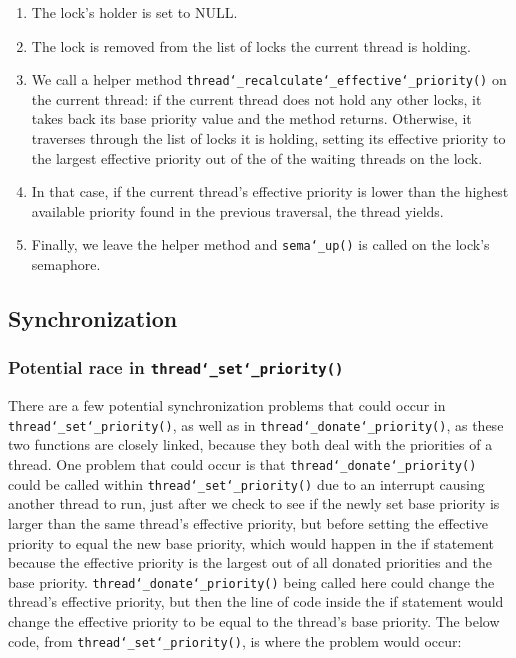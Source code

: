 \documentclass{article}
\renewcommand{\_}{\char`_}
\begin{document}
\begin{enumerate}

\item The lock's holder is set to NULL.

\item The lock is removed from the list of locks the current thread is holding.

\item We call a helper method \texttt{thread\_recalculate\_effective\_priority()} on the current thread: if the current thread does not hold any other locks, it takes back its base priority value and the method returns. Otherwise, it traverses through the list of locks it is holding, setting its effective priority to the largest effective priority out of the of the waiting threads on the lock.

\item In that case, if the current thread's effective priority is lower than the highest available priority found in the previous traversal, the thread yields.

\item Finally, we leave the helper method and \texttt{sema\_up()} is called on the lock's semaphore.

\end{enumerate}

\subsection{Synchronization}
\subsubsection{Potential race in \texttt{thread\_set\_priority()}}

There are a few potential synchronization problems that could occur in \texttt{thread\_set\_priority()}, as well as in \texttt{thread\_donate\_priority()}, as these two functions are closely linked, because they both deal with the priorities of a thread. One problem that could occur is that \texttt{thread\_donate\_priority()} could be called within \texttt{thread\_set\_priority()} due to an interrupt causing another thread to run, just after we check to see if the newly set base priority is larger than the same thread's effective priority, but before setting the effective priority to equal the new base priority, which would happen in the if statement because the effective priority is the largest out of all donated priorities and the base priority. \texttt{thread\_donate\_priority()} being called here could change the thread's effective priority, but then the line of code inside the if statement would change the effective priority to be equal to the thread's base priority. The below code, from \texttt{thread\_set\_priority()}, is where the problem would occur:
\end{document}
